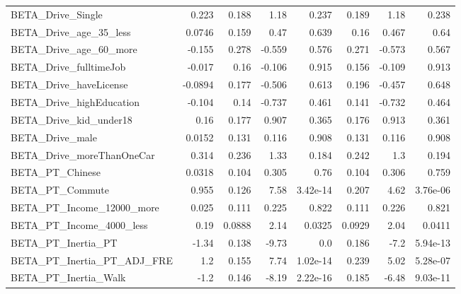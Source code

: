 \begin{tabular}{lrrrrrrr}
BETA\_Drive\_Single                &     0.223 &    0.188 &      1.18 &    0.237 &         0.189 &         1.18 &         0.238 \\
BETA\_Drive\_age\_35\_less           &    0.0746 &    0.159 &      0.47 &    0.639 &          0.16 &        0.467 &          0.64 \\
BETA\_Drive\_age\_60\_more           &    -0.155 &    0.278 &    -0.559 &    0.576 &         0.271 &       -0.573 &         0.567 \\
BETA\_Drive\_fulltimeJob           &    -0.017 &     0.16 &    -0.106 &    0.915 &         0.156 &       -0.109 &         0.913 \\
BETA\_Drive\_haveLicense           &   -0.0894 &    0.177 &    -0.506 &    0.613 &         0.196 &       -0.457 &         0.648 \\
BETA\_Drive\_highEducation         &    -0.104 &     0.14 &    -0.737 &    0.461 &         0.141 &       -0.732 &         0.464 \\
BETA\_Drive\_kid\_under18           &      0.16 &    0.177 &     0.907 &    0.365 &         0.176 &        0.913 &         0.361 \\
BETA\_Drive\_male                  &    0.0152 &    0.131 &     0.116 &    0.908 &         0.131 &        0.116 &         0.908 \\
BETA\_Drive\_moreThanOneCar        &     0.314 &    0.236 &      1.33 &    0.184 &         0.242 &          1.3 &         0.194 \\
BETA\_PT\_Chinese                  &    0.0318 &    0.104 &     0.305 &     0.76 &         0.104 &        0.306 &         0.759 \\
BETA\_PT\_Commute                  &     0.955 &    0.126 &      7.58 & 3.42e-14 &         0.207 &         4.62 &      3.76e-06 \\
BETA\_PT\_Income\_12000\_more        &     0.025 &    0.111 &     0.225 &    0.822 &         0.111 &        0.226 &         0.821 \\
BETA\_PT\_Income\_4000\_less         &      0.19 &   0.0888 &      2.14 &   0.0325 &        0.0929 &         2.04 &        0.0411 \\
BETA\_PT\_Inertia\_PT               &     -1.34 &    0.138 &     -9.73 &      0.0 &         0.186 &         -7.2 &      5.94e-13 \\
BETA\_PT\_Inertia\_PT\_ADJ\_FRE       &       1.2 &    0.155 &      7.74 & 1.02e-14 &         0.239 &         5.02 &      5.28e-07 \\
BETA\_PT\_Inertia\_Walk             &      -1.2 &    0.146 &     -8.19 & 2.22e-16 &         0.185 &        -6.48 &      9.03e-11 \\

\end{tabular}
